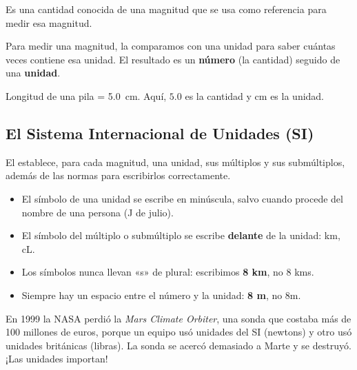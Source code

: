 \begin{definition}[Unidad]
    Es una cantidad conocida de una magnitud que se usa como referencia para medir esa magnitud.
\end{definition}

Para medir una magnitud, la comparamos con una unidad para saber cuántas veces contiene esa unidad. El resultado es un \textbf{número} (la cantidad) seguido de una \textbf{unidad}.

\begin{example}
    Longitud de una pila = \qty{5.0}{\cm}. Aquí, \(\num{5.0}\) es la cantidad y \(\unit{\cm}\) es la unidad.
\end{example}

\subsection{El Sistema Internacional de Unidades (SI)}

El  establece, para cada magnitud, una unidad, sus múltiplos y sus submúltiplos, además de las normas para escribirlos correctamente.

\begin{itemize}
    \item El símbolo de una unidad se escribe en minúscula, salvo cuando procede del nombre de una persona (J de julio).
    \item El símbolo del múltiplo o submúltiplo se escribe \textbf{delante} de la unidad: km, cL.
    \item Los símbolos nunca llevan «s» de plural: escribimos \textbf{8 km}, no 8 kms.
    \item Siempre hay un espacio entre el número y la unidad: \textbf{8 m}, no 8m.
\end{itemize}

\begin{didyouknow}
    En 1999 la NASA perdió la \emph{Mars Climate Orbiter}, una sonda que costaba más de 100 millones de euros, porque un equipo usó unidades del SI (newtons) y otro usó unidades británicas (libras). La sonda se acercó demasiado a Marte y se destruyó. ¡Las unidades importan!
\end{didyouknow}

